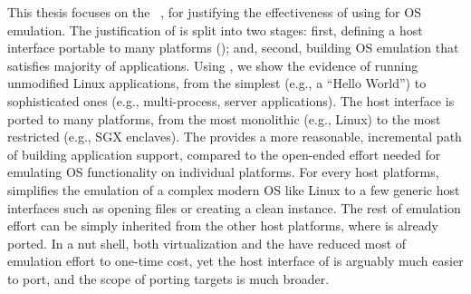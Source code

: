 This thesis focuses on the \term{\graphene{} \libos{}}~\citep{tsai14graphene}, for justifying the effectiveness of using \liboses{} for OS emulation.
The justification of \graphene{} is split into two stages:
first, defining a host interface portable to many platforms ();
and, second, building OS emulation that satisfies majority of applications.
Using \graphene{}, we show the evidence of running unmodified Linux applications, from the simplest (e.g., a ``Hello World'') to sophisticated ones (e.g., multi-process, server applications).
The host interface is ported to many platforms, from the most monolithic (e.g., Linux)
to the most restricted (e.g., SGX enclaves).
The \graphene{} \libos{} provides a more reasonable, incremental path of building application support,
compared to the open-ended effort needed for emulating OS functionality on individual platforms.
For every host platforms,
\graphene{} simplifies the emulation of a complex modern OS like Linux
to a few generic host interfaces
such as opening files or creating a clean instance.
The rest of emulation effort can be simply inherited from the other host platforms,
where \graphene{} is already ported.
In a nut shell, both virtualization and the \graphene{} \libos{} have reduced most of emulation effort to one-time cost,
yet the host interface of \graphene{} is arguably much easier to port,
and the scope of porting targets is much broader.
 


